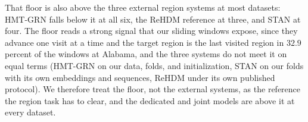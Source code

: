 That floor is also above the three external region systems at most datasets: HMT-GRN falls below
it at all six, the ReHDM reference at three, and STAN at four. The floor reads a strong signal that
our sliding windows expose, since they advance one visit at a time and the target region is the
last visited region in $32.9$ percent of the windows at Alabama, and the three systems do not meet
it on equal terms (HMT-GRN on our data, folds, and initialization, STAN on our folds with its own
embeddings and sequences, ReHDM under its own published protocol). We therefore treat the floor,
not the external systems, as the reference the region task has to clear, and the dedicated and
joint models are above it at every dataset.
